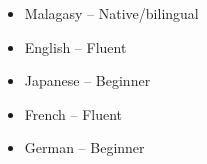 

\begin{itemize}

        \item Malagasy -- Native/bilingual

        \item English -- Fluent

        \item Japanese -- Beginner

        \item French -- Fluent

        \item German -- Beginner


\end{itemize}
